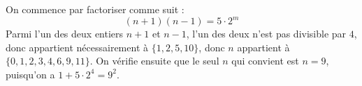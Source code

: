 On commence par factoriser comme suit :
$$(n + 1)(n - 1) = 5\cdot 2^m$$
Parmi l'un des deux entiers $n + 1$ et $n - 1$, l'un des deux n'est pas divisible par $4$, donc appartient nécessairement à $\{1,2,5,10\}$, donc $n$ appartient à $\{0, 1, 2, 3, 4, 6, 9, 11\}$. On vérifie ensuite que le seul $n$ qui convient est $n=9$, puisqu'on a $1 + 5\cdot 2^4 = 9^2$.